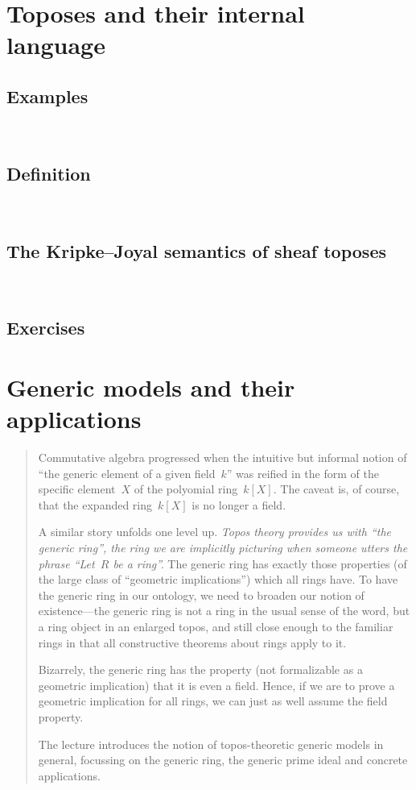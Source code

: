\documentclass[10pt,reqno,a4paper,openany]{amsbook}
\theoremstyle{definition}
\theoremstyle{plain}
\theoremstyle{remark}
\newcommand{\?}{\,{:}\,}
\renewcommand{\_}{\mathpunct{.}\,}
\newenvironment{intro}{\begin{quote}}{\end{quote}\bigskip}
\begin{document}
\chapter{Toposes and their internal language}
\label{lect:toposes}

\section{Examples}
\newpage
\ \newpage

\section{Definition}
\newpage
\ \newpage

\section{The Kripke--Joyal semantics of sheaf toposes}
\newpage
\ \newpage

\section{Exercises}


\chapter{Generic models and their applications}
\label{lect:generic}

\begin{intro}
Commutative algebra progressed when the intuitive but informal notion of
``the generic element of a given field~$k$'' was reified in the form of the
specific element~$X$ of the polyomial ring~$k[X]$. The caveat is, of course,
that the expanded ring~$k[X]$ is no longer a field.

A similar story unfolds one level up. \emph{Topos theory provides us with ``the
generic ring'', the ring we are implicitly picturing when someone utters
the phrase ``Let~$R$ be a ring''.} The generic ring has exactly those
properties (of the large class of ``geometric implications'') which all rings
have. To have the generic ring in our ontology,
we need to broaden our notion of existence---the generic ring is not a
ring in the usual sense of the word, but a ring object in an enlarged
topos, and still close enough to the familiar rings in that all
constructive theorems about rings apply to it.

Bizarrely, the generic ring has the property (not formalizable as a
geometric implication) that it is even a field. Hence, if we are to
prove a geometric implication for all rings, we can just as well assume
the field property.

The lecture introduces the notion of topos-theoretic generic models in
general, focussing on the generic ring, the generic prime ideal and
concrete applications.
\end{intro}
\end{document}
